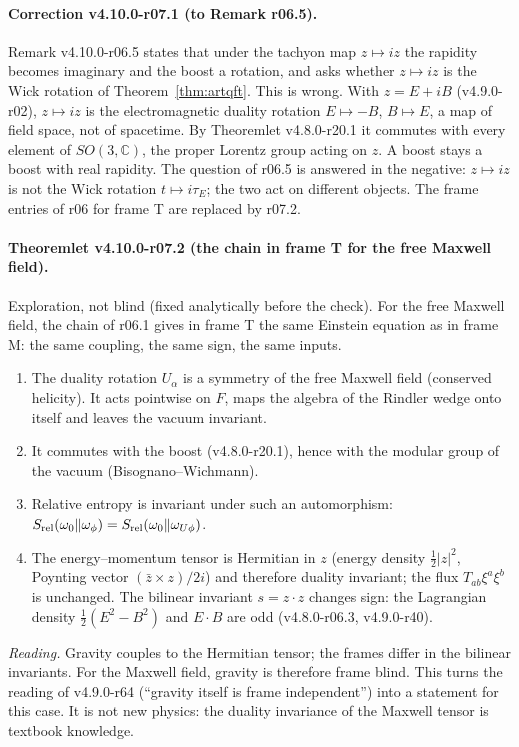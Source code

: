 \paragraph{Correction v4.10.0-r07.1 (to Remark r06.5).}
Remark v4.10.0-r06.5 states that under the tachyon map \(z\mapsto iz\) the rapidity becomes imaginary and the boost a rotation, and asks whether
\(z\mapsto iz\) is the Wick rotation of Theorem~\ref{thm:artqft}.  This is wrong.  With \(z=E+iB\) (v4.9.0-r02), \(z\mapsto iz\) is the
electromagnetic duality rotation \(E\mapsto-B\), \(B\mapsto E\), a map of field space, not of spacetime.  By Theoremlet v4.8.0-r20.1 it commutes with
every element of \(SO(3,\mathbb C)\), the proper Lorentz group acting on \(z\).  A boost stays a boost with real rapidity.  The question of r06.5 is
answered in the negative: \(z\mapsto iz\) is not the Wick rotation \(t\mapsto i\tau_E\); the two act on different objects.  The frame entries of r06 for
frame T are replaced by r07.2.

\paragraph{Theoremlet v4.10.0-r07.2 (the chain in frame T for the free Maxwell field).}
Exploration, not blind (fixed analytically before the check).  For the free Maxwell field, the chain of r06.1 gives in frame T the same Einstein
equation as in frame M: the same coupling, the same sign, the same inputs.
\begin{enumerate}[leftmargin=2em]
\item[(a)] The duality rotation \(U_\alpha\) is a symmetry of the free Maxwell field (conserved helicity).  It acts pointwise on \(F\), maps the algebra of
the Rindler wedge onto itself and leaves the vacuum invariant.
\item[(b)] It commutes with the boost (v4.8.0-r20.1), hence with the modular group of the vacuum (Bisognano--Wichmann).
\item[(c)] Relative entropy is invariant under such an automorphism: \(S_{\rm rel}(\omega_0\Vert\omega_\phi)=S_{\rm rel}(\omega_0\Vert\omega_{U\phi})\).
\item[(d)] The energy--momentum tensor is Hermitian in \(z\) (energy density \(\tfrac12|z|^2\), Poynting vector \((\bar z\times z)/2i\)) and therefore
duality invariant; the flux \(T_{ab}\xi^a\xi^b\) is unchanged.  The bilinear invariant \(s=z\cdot z\) changes sign: the Lagrangian density
\(\tfrac12(E^2-B^2)\) and \(E\cdot B\) are odd (v4.8.0-r06.3, v4.9.0-r40).
\end{enumerate}
\emph{Reading.} Gravity couples to the Hermitian tensor; the frames differ in the bilinear invariants.  For the Maxwell field, gravity is therefore
frame blind.  This turns the reading of v4.9.0-r64 (``gravity itself is frame independent'') into a statement for this case.  It is not new physics:
the duality invariance of the Maxwell tensor is textbook knowledge.

